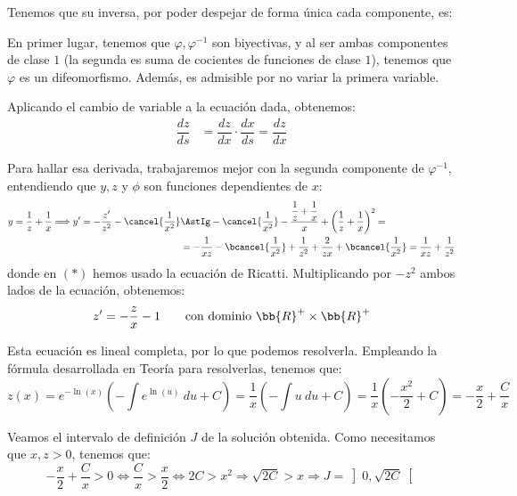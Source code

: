 \begin{ejercicio}
    Tenemos que su inversa, por poder despejar de forma única cada componente, es:

    En primer lugar, tenemos que $\varphi,\varphi^{-1}$ son biyectivas, y al ser ambas componentes de clase $1$ (la segunda es suma de cocientes de funciones de clase $1$), tenemos que $\varphi$ es un difeomorfismo. Además, es admisible por no variar la primera variable.

    Aplicando el cambio de variable a la ecuación dada, obtenemos:
    \begin{align*}
        \dfrac{dz}{ds} &= \dfrac{dz}{dx}\cdot \dfrac{dx}{ds} = \dfrac{dz}{dx}
    \end{align*}

    Para hallar esa derivada, trabajaremos mejor con la segunda componente de $\varphi^{-1}$, entendiendo que $y, z$ y $\phi$ son funciones dependientes de $x$:
    \begin{align*}
        y = \dfrac{1}{z}+\dfrac{1}{x} \Longrightarrow y' = -\dfrac{z'}{z^2}-\cancel{\dfrac{1}{x^2}} &\AstIg
        -\cancel{\dfrac{1}{x^2}} - \dfrac{\dfrac{1}{z}+\dfrac{1}{x}}{x} + \left(\dfrac{1}{z}+\dfrac{1}{x}\right)^2
        =\\&= -\dfrac{1}{xz} - \bcancel{\dfrac{1}{x^2}} + \dfrac{1}{z^2} + \dfrac{2}{zx} + \bcancel{\dfrac{1}{x^2}} = \dfrac{1}{xz} + \dfrac{1}{z^2}
    \end{align*}
    donde en $(\ast)$ hemos usado la ecuación de Ricatti. Multiplicando por $-z^2$ ambos lados de la ecuación, obtenemos:
    \begin{equation*}
        z'=-\dfrac{z}{x} -1\qquad \text{con dominio }\bb{R}^+\times \bb{R}^+
    \end{equation*}

    Esta ecuación es lineal completa, por lo que podemos resolverla. Empleando la fórmula desarrollada en Teoría para resolverlas, tenemos que:
    \begin{equation*}
        z(x) = e^{-\ln(x)}\left(-\int e^{\ln(u)}~du + C\right) = \dfrac{1}{x}\left(-\int u~du + C\right) = \dfrac{1}{x}\left(-\dfrac{x^2}{2} + C\right) = -\dfrac{x}{2} + \dfrac{C}{x}
    \end{equation*}

    Veamos el intervalo de definición $J$ de la solución obtenida. Como necesitamos que $x,z>0$, tenemos que:
    \begin{equation*}
        -\dfrac{x}{2} + \dfrac{C}{x} > 0 \Longleftrightarrow \dfrac{C}{x} > \dfrac{x}{2} \Longleftrightarrow 2C > x^2
        \Longrightarrow \sqrt{2C} > x \Longrightarrow J = \left]0,\sqrt{2C}\right[
    \end{equation*}


\end{ejercicio}
